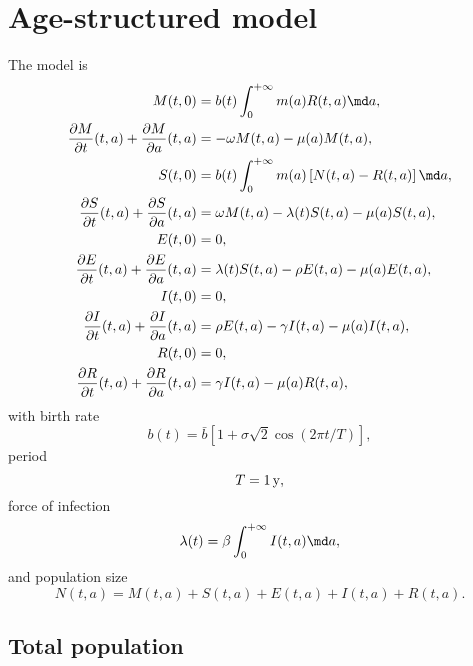 \documentclass{jpmarticle}
\begin{document}
\section{Age-structured model}

The model is
\begin{equation}
  \label{model_age_structured}
  \begin{split}
    M(t, 0)
    &= b(t) \int_0^{+\infty} m(a) R(t, a) \md a,
    \\
    \frac{\partial M}{\partial t}(t, a)
    + \frac{\partial M}{\partial a}(t, a)
    &= - \omega M(t, a) - \mu(a) M(t, a),
    \\
    S(t, 0)
    &= b(t) \int_0^{+\infty} m(a) \left[N(t, a) - R(t, a)\right] \md a,
    \\
    \frac{\partial S}{\partial t}(t, a)
    + \frac{\partial S}{\partial a}(t, a)
    &= \omega M(t, a) - \lambda(t) S(t, a) - \mu(a) S(t, a),
    \\
    E(t, 0)
    &= 0,
    \\
    \frac{\partial E}{\partial t}(t, a)
    + \frac{\partial E}{\partial a}(t, a)
    &= \lambda(t) S(t, a) - \rho E(t, a) - \mu(a) E(t, a),
    \\
    I(t, 0)
    &= 0,
    \\
    \frac{\partial I}{\partial t}(t, a)
    + \frac{\partial I}{\partial a}(t, a)
    &= \rho E(t, a) - \gamma I(t, a) - \mu(a) I(t, a),
    \\
    R(t, 0)
    &= 0,
    \\
    \frac{\partial R}{\partial t}(t, a)
    + \frac{\partial R}{\partial a}(t, a)
    &= \gamma I(t, a) - \mu(a) R(t, a),
  \end{split}
\end{equation}
with birth rate
\begin{equation}
  b(t) = \bar{b} \left[
    1 + \sigma \sqrt{2} \cos\left(2 \pi t / T\right)
  \right],
\end{equation}
period
\begin{equation}
  T = \unit[1]y,
\end{equation}
force of infection
\begin{equation}
  \lambda(t) = \beta \int_0^{+\infty} I(t, a) \md a,
\end{equation}
and population size
\begin{equation}
  N(t, a) = M(t, a) + S(t, a) + E(t, a) + I(t, a) + R(t, a).
\end{equation}

\subsection{Total population}
\end{document}
